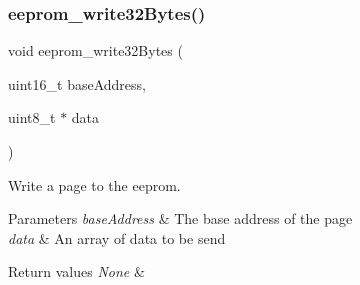\subsubsection{\texorpdfstring{eeprom\+\_\+write32\+Bytes()}{eeprom\_write32Bytes()}}
{\footnotesize\ttfamily void eeprom\+\_\+write32\+Bytes (\begin{DoxyParamCaption}\item[{uint16\+\_\+t}]{base\+Address,  }\item[{uint8\+\_\+t $\ast$}]{data }\end{DoxyParamCaption})}



Write a page to the eeprom. 


\begin{DoxyParams}{Parameters}
{\em base\+Address} & The base address of the page \\
\hline
{\em data} & An array of data to be send \\
\hline
\end{DoxyParams}

\begin{DoxyRetVals}{Return values}
{\em None} & \\
\hline
\end{DoxyRetVals}
